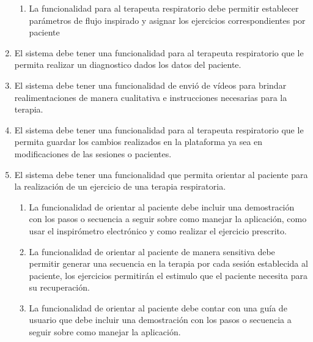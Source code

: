 \documentclass[12pt]{article}
\begin{document}
\begin{enumerate}[start=1,label={\bfseries RF0\arabic*.}]
\begin{enumerate}[label*=\arabic*.]
                \item La funcionalidad para al terapeuta respiratorio debe permitir establecer parámetros de flujo inspirado y asignar los ejercicios correspondientes por paciente
                
                
            \end{enumerate}
            
    \item El sistema debe tener una funcionalidad para al terapeuta respiratorio que le permita realizar un diagnostico dados los datos del paciente.%
    
    \item  El sistema debe tener una funcionalidad de envió de vídeos para brindar realimentaciones de manera cualitativa e instrucciones necesarias para la terapia.
    
    
    \item El sistema debe tener una funcionalidad para al terapeuta respiratorio que le permita guardar los cambios realizados en la plataforma ya sea en modificaciones de las sesiones o pacientes.
    
    
    
            

    \item El sistema debe tener una funcionalidad que permita orientar al paciente  para la realización de un ejercicio de una terapia respiratoria. 
    \label{RF08}
            \begin{enumerate}[label*=\arabic*.]
            
                \item La funcionalidad de orientar al paciente debe incluir una demostración con los pasos o secuencia a seguir sobre como manejar la aplicación, como usar el inspirómetro electrónico y como realizar el ejercicio prescrito.
                
                \item La funcionalidad de orientar al paciente de manera sensitiva debe permitir generar una secuencia en la terapia por cada sesión establecida al paciente, los ejercicios permitirán el estimulo que el paciente  necesita para su recuperación. %
                
                \item La funcionalidad de orientar al paciente debe contar con una guía de usuario que debe incluir una demostración con los pasos o secuencia a seguir sobre como manejar la aplicación.
                

\end{enumerate}
\end{enumerate}
\end{document}
